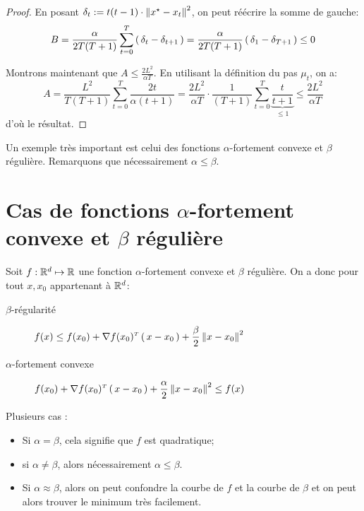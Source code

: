 \begin{proof}
En posant $\delta_t := t(t-1) \cdot \norme{\xopt-x_t}^2$, on peut réécrire la somme
 de gauche:
\begin{equation*}
B= \frac{\alpha}{2T(T+1)} \sum_{t=0}^T \left( \, \delta_t-\delta_{t+1} \, \right)
=\frac{\alpha}{2T(T+1)} \left( \, \delta_1-\delta_{T+1} \, \right)
\leq 0
\end{equation*}

Montrons maintenant que $A \leq \frac{2 L^2}{\alpha T}$. En utilisant la définition
 du pas $\mu_t$, on a:
 \begin{equation*}
   A= \frac{L^2}{T(T+1)} \sum_{t=0}^T \frac{2t}{\alpha (t+1)}
   = \frac{2L^2}{\alpha T} \cdot  \frac{1}{(T+1)}\sum_{t=0}^T \underbrace{\frac{t}{t+1}}_{\leq 1} \leq \frac{2L^2}{\alpha T}
 \end{equation*}
d'où le résultat.
\end{proof}

Un exemple très important est celui des fonctions $\alpha$-fortement convexe et
 $\beta$ régulière. Remarquons que nécessairement $\alpha \leq \beta$.

 \section{Cas de fonctions $\alpha$-fortement convexe et
  $\beta$ régulière}

  Soit $f: \mathbb{R}^d \mapsto \mathbb{R}$ une fonction $\alpha$-fortement convexe et
   $\beta$ régulière. On a donc pour tout $x, x_0$ appartenant à $\mathbb{R}^d$:
   \begin{description}
     \item[$\beta$-régularité] $\displaystyle f(x) \leq f(x_0)+ \transpose{\grad f(x_0)}\prt{x-x_0}+ \frac{\beta}{2}\norme{x-x_0}^2$
     \item[$\alpha$-fortement convexe] $\displaystyle f(x_0)+ \transpose{\grad f(x_0)}\prt{x-x_0}+ \frac{\alpha}{2}\norme{x-x_0}^2 \leq  f(x) $
   \end{description}

   Plusieurs cas :
   \begin{itemize}
     \item Si $\alpha=\beta$, cela signifie que $f$ est quadratique;
     \item si $\alpha \neq \beta$, alors nécessairement $\alpha \leq \beta$.
     \item Si $\alpha \approx \beta$, alors on peut confondre la courbe de $f$ et
     la courbe de $\beta$ et on peut alors trouver le minimum très facilement.
   \end{itemize}

